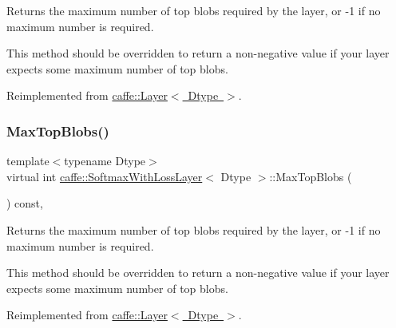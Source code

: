 Returns the maximum number of top blobs required by the layer, or -\/1 if no maximum number is required. 

This method should be overridden to return a non-\/negative value if your layer expects some maximum number of top blobs. 

Reimplemented from \mbox{\hyperlink{classcaffe_1_1_layer_ac6c03df0b6e40e776c94001e19994a2e}{caffe\+::\+Layer$<$ Dtype $>$}}.

\mbox{\label{classcaffe_1_1_softmax_with_loss_layer_a5a0b4c02fe76ae9087cd8b1b9edd9910}} 
\subsubsection{\texorpdfstring{Max\+Top\+Blobs()}{MaxTopBlobs()}\hspace{0.1cm}{\footnotesize\ttfamily [2/2]}}
{\footnotesize\ttfamily template$<$typename Dtype$>$ \\
virtual int \mbox{\hyperlink{classcaffe_1_1_softmax_with_loss_layer}{caffe\+::\+Softmax\+With\+Loss\+Layer}}$<$ Dtype $>$\+::Max\+Top\+Blobs (\begin{DoxyParamCaption}{ }\end{DoxyParamCaption}) const\hspace{0.3cm}{\ttfamily [inline]}, {\ttfamily [virtual]}}



Returns the maximum number of top blobs required by the layer, or -\/1 if no maximum number is required. 

This method should be overridden to return a non-\/negative value if your layer expects some maximum number of top blobs. 

Reimplemented from \mbox{\hyperlink{classcaffe_1_1_layer_ac6c03df0b6e40e776c94001e19994a2e}{caffe\+::\+Layer$<$ Dtype $>$}}.

\mbox{\label{classcaffe_1_1_softmax_with_loss_layer_a9969336702fb1bbf31750629fb38fb45}} 
